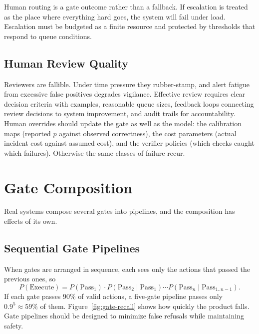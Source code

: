 \documentclass[11pt]{book}
\begin{document}
Human routing is a gate outcome rather than a fallback. If escalation is treated as the place where everything hard goes, the system will fail under load. Escalation must be budgeted as a finite resource and protected by thresholds that respond to queue conditions.

\subsection{Human Review Quality}

Reviewers are fallible. Under time pressure they rubber-stamp, and alert fatigue from excessive false positives degrades vigilance. Effective review requires clear decision criteria with examples, reasonable queue sizes, feedback loops connecting review decisions to system improvement, and audit trails for accountability. Human overrides should update the gate as well as the model: the calibration maps (reported $p$ against observed correctness), the cost parameters (actual incident cost against assumed cost), and the verifier policies (which checks caught which failures). Otherwise the same classes of failure recur.

\section{Gate Composition}

Real systems compose several gates into pipelines, and the composition has effects of its own.

\subsection{Sequential Gate Pipelines}

When gates are arranged in sequence, each sees only the actions that passed the previous ones, so
\[
P(\text{Execute}) = P(\text{Pass}_1) \cdot P(\text{Pass}_2 \mid \text{Pass}_1) \cdots P(\text{Pass}_n \mid \text{Pass}_{1..n-1}).
\]
If each gate passes 90\% of valid actions, a five-gate pipeline passes only $0.9^5 \approx 59\%$ of them. Figure~\ref{fig:gate-recall} shows how quickly the product falls. Gate pipelines should be designed to minimize false refusals while maintaining safety.
\end{document}
